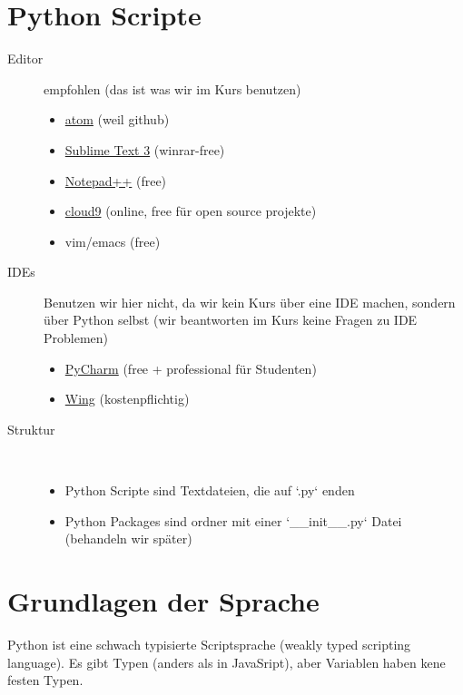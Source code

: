 \section{Python Scripte}
\begin{description}
    \item[Editor] empfohlen (das ist was wir im Kurs benutzen) \\
    \begin{itemize}
        \item \href{https://atom.io}{atom} (weil github)
        \item \href{http://www.sublimetext.com/3}{Sublime Text 3} (winrar-free)
        \item \href{http://notepad-plus-plus.org}{Notepad++} (free)
        \item \href{https://c9.i}{cloud9} (online, free für open source projekte)
        \item vim/emacs (free)
    \end{itemize}
    \item[IDEs] Benutzen wir hier nicht, da wir kein Kurs über eine IDE machen, sondern über Python selbst (wir beantworten im Kurs keine Fragen zu IDE Problemen) \\
    \begin{itemize}
        \item \href{https://jetbrains.com/pycharm}{PyCharm} (free + professional für Studenten)
        \item \href{https://wingware.com/}{Wing} (kostenpflichtig)
    \end{itemize}
    \item[Struktur] \hfill \\
    \begin{itemize}
        \item Python Scripte sind Textdateien, die auf `.py` enden
        \item Python Packages sind ordner mit einer `__init__.py` Datei (behandeln wir später)
    \end{itemize}
\end{description}


\section{Grundlagen der Sprache}
Python ist eine schwach typisierte Scriptsprache (weakly typed scripting language). Es gibt Typen (anders als in JavaSript), aber Variablen haben kene festen Typen.


